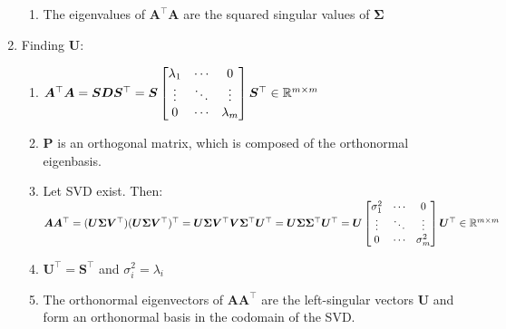 \begin{enumerate}
\begin{enumerate}
        \item The eigenvalues of $\bm{A}^\top \bm{A}$ are the squared singular values of $\bm{\Sigma}$ 
        \hfill \cite{mfml/book/mml/Deisenroth-Faisal-Ong}
    \end{enumerate}

    \item Finding $\bm{U}$:
    \begin{enumerate}
        \item $
            \bm{A}^\top \bm{A} 
            = \bm{SDS} ^\top 
            = \bm{S} \begin{bmatrix}
                \lambda_1 & \cdots & 0 \\
                \vdots & \ddots & \vdots \\
                0 & \cdots & \lambda_m
            \end{bmatrix} \bm{S} ^\top  
            \in \mathbb{R}^{m\times m}
        $
        \hfill \cite{mfml/book/mml/Deisenroth-Faisal-Ong}

        \item $\bm{P}$ is an orthogonal matrix, which is composed of the orthonormal eigenbasis.
        \hfill \cite{mfml/book/mml/Deisenroth-Faisal-Ong}

        \item Let SVD exist. Then:
        \hfill \cite{mfml/book/mml/Deisenroth-Faisal-Ong}
        \\
        $
            \bm{A} \bm{A} ^\top
            = (\bm{U\Sigma V}^\top) (\bm{U\Sigma V}^\top) ^\top
            = \bm{U\Sigma V}^\top \bm{V} \bm{\Sigma}^\top \bm{U}^\top 
            = \bm{U} \bm{\Sigma} \bm{\Sigma}^\top \bm{U}^\top
            = \bm{U} \begin{bmatrix}
                \sigma_1^2 & \cdots & 0 \\
                \vdots & \ddots & \vdots \\
                0 & \cdots & \sigma_m^2
            \end{bmatrix} \bm{U} ^\top  
            \in \mathbb{R}^{m\times m}
        $
        \hfill \cite{mfml/book/mml/Deisenroth-Faisal-Ong}

        \item $\bm{U}^\top = \bm{S}^\top$ and $\sigma^2_i = \lambda_i$
        \hfill \cite{mfml/book/mml/Deisenroth-Faisal-Ong}

        \item The orthonormal eigenvectors of $\bm{AA}^\top$ are the left-singular vectors $\bm{U}$ and form an orthonormal basis in the codomain of the SVD.
        \hfill \cite{mfml/book/mml/Deisenroth-Faisal-Ong}
    \end{enumerate}


\end{enumerate}
